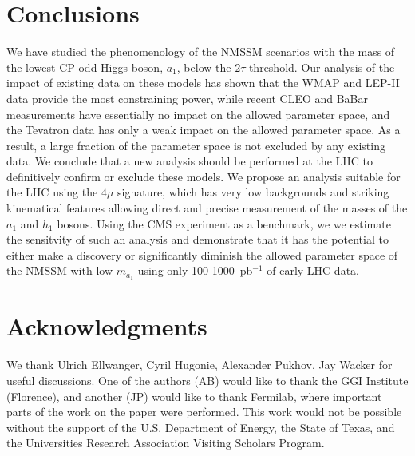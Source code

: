 \documentclass[aps,prl,twocolumn,nofootinbib,superscriptaddress]{revtex4}
\begin{document}
\section{Conclusions}

We have studied the phenomenology of the NMSSM scenarios with the mass
of the lowest CP-odd Higgs boson, $a_1$, below the $2\tau$ threshold.
Our analysis of the impact of existing data on these models has shown
that the WMAP and LEP-II data provide the most constraining power,
while recent CLEO and BaBar measurements have essentially no impact on
the allowed parameter space, and the Tevatron data has only a weak
impact on the allowed parameter space.  As a result, a large fraction
of the parameter space is not excluded by any existing data.  We
conclude that a new analysis should be performed at the LHC to
definitively confirm or exclude these models.  We propose an analysis
suitable for the LHC using the $4\mu$ signature, which has very low
backgrounds and striking kinematical features allowing direct and
precise measurement of the masses of the $a_1$ and $h_1$ bosons.
Using the CMS experiment as a benchmark, we we estimate the sensitvity
of such an analysis and demonstrate that it has the potential to
either make a discovery or significantly diminish the allowed
parameter space of the NMSSM with low $m_{a_1}$ using only
100-1000~pb$^{-1}$ of early LHC data.
  
\section*{Acknowledgments}

We thank Ulrich Ellwanger, Cyril Hugonie, Alexander Pukhov, Jay Wacker
for useful discussions. One of the authors (AB) would like to thank
the GGI Institute (Florence), and another (JP) would like to thank
Fermilab, where important parts of the work on the paper were
performed.  This work would not be possible without the support of the
U.S. Department of Energy, the State of Texas, and the Universities
Research Association Visiting Scholars Program.

\def\Journal#1#2#3#4{{#1} {\bf #2}, #3 (#4)}
\def\NCA{Nuovo Cimento}
\def\NIM{Nucl. Instrum. Methods}
\def\NIMA{{Nucl. Instrum. Methods} A}
\def\NP{Nucl. Phys.} 
\def\NPB{{Nucl. Phys.} B}
\def\PLB{{Phys. Lett.}  B}
\def\PRL{Phys. Rev. Lett.}
\def\RPP{Rep. Prog. Phys.}
\def\PRD{{Phys. Rev.} D}
\def\PR{Phys. Rep.}
\def\PRP{Prog. Theor. Phys.}
\def\ZPC{{Z. Phys.} C}
\def\MPL{{Mod. Phys. Lett.} A}
\def\EPJC{{Eur. Phys. J.} C}
\def\CPC{Comput. Phys. Commun.}
\end{document}
